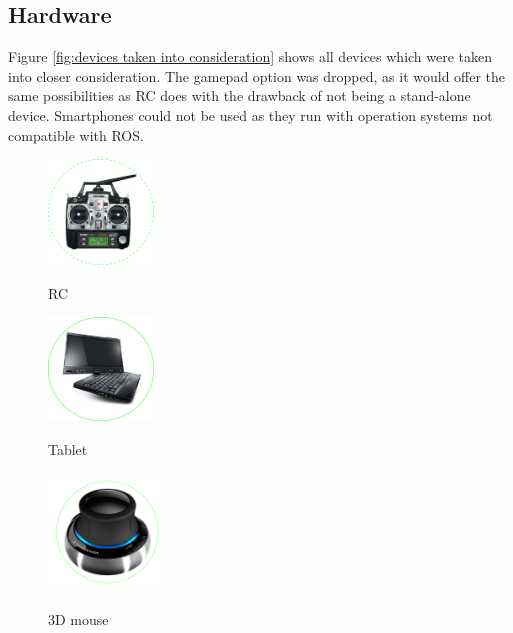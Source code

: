 \subsection{Hardware}
\label{sub:hardware}

Figure \ref{fig:devices taken into consideration} shows all devices which were taken into closer consideration. The gamepad option was dropped, as it would offer the same possibilities as RC does with the drawback of not being a stand-alone device. Smartphones could not be used as they run with operation systems not compatible with \textsc{ROS}.

\begin{figure}[h]		
	\small{
		\begin{center}
			\parbox[b]{0.25\textwidth}{\includegraphics[width=0.25\textwidth]{futaba_7C_radio_encircled}
			\begin{center}RC \end{center}}
			\hspace{0.05\textwidth}
			\parbox[b]{0.25\textwidth}{\includegraphics[width=0.25\textwidth]{x220t_hero_encircled}
			\begin{center}Tablet \end{center}}
			\hspace{0.05 \textwidth}
			\parbox[b]{0.28\textwidth}{\includegraphics[width=0.28\textwidth]{3dx_productimage_encircled}
			\begin{center}3D mouse \end{center}}			

\end{center}}
\end{figure}
